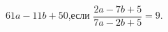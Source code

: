 \begin{ex}[type=calculate_expression]
	\begin{condition}
		\( 61a-11b+50 \),\quad если \( \dfrac{2a-7b+5}{7a-2b+5}=9 \).
	\end{condition}
\end{ex}